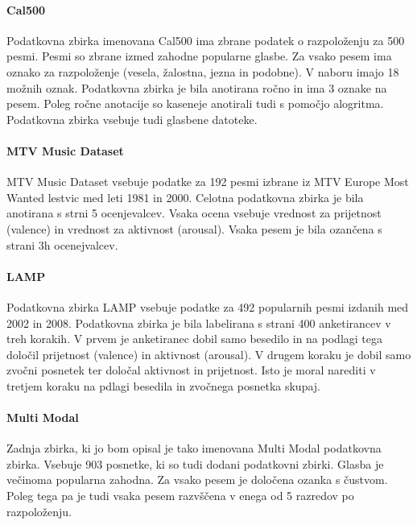 \documentclass[a4paper, 12pt]{book}
\begin{document}
{\paragraph{Cal500}

Podatkovna zbirka imenovana Cal500 \cite{turnbull2008semantic} ima zbrane podatek o razpoloženju za 500 pesmi. Pesmi so zbrane izmed zahodne popularne glasbe. Za vsako pesem ima oznako za razpoloženje (vesela, žalostna, jezna in podobne). V naboru imajo 18 možnih oznak. Podatkovna zbirka je bila anotirana ročno in ima 3 oznake na pesem. Poleg ročne anotacije so kaseneje anotirali tudi s pomočjo alogritma. Podatkovna zbirka vsebuje tudi glasbene datoteke.

\paragraph{MTV Music Dataset}

MTV Music Dataset \cite{schuller2010mister} vsebuje podatke za 192 pesmi izbrane iz MTV Europe Most Wanted lestvic med leti 1981 in 2000. Celotna podatkovna zbirka je bila anotirana s strni 5 ocenjevalcev. Vsaka ocena vsebuje vrednost za prijetnost (valence) in vrednost za aktivnost (arousal). Vsaka pesem je bila ozančena s strani 3h ocenejvalcev.

\paragraph{LAMP}

Podatkovna zbirka LAMP \cite{chu2010lamp} vsebuje podatke za 492 popularnih pesmi izdanih med 2002 in 2008. Podatkovna zbirka je bila labelirana s strani 400 anketirancev v treh korakih. V prvem je anketiranec dobil samo besedilo in  na podlagi tega določil prijetnost (valence) in aktivnost (arousal). V drugem koraku je dobil samo zvočni posnetek ter določal aktivnost in prijetnost. Isto je moral narediti v tretjem koraku na pdlagi besedila in zvočnega posnetka skupaj. 

\paragraph{Multi Modal}

Zadnja zbirka, ki jo bom opisal je tako imenovana Multi Modal \cite{panda2013multi} podatkovna zbirka. Vsebuje 903 posnetke, ki so tudi dodani podatkovni zbirki. Glasba je večinoma popularna zahodna. Za vsako pesem je določena ozanka s čustvom. Poleg tega pa je tudi vsaka pesem razvščena v enega od 5 razredov po razpoloženju. 

}
\end{document}
